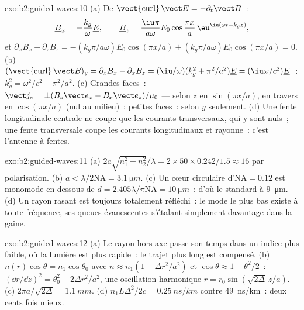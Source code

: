 \begin{solution}{exo:b2:guided-waves:10}
(a) De $\operatorname{\vect{curl}}\vect E = -\partial_t\vect B$~:
\[
\underline B_x = -\frac{k_g}\omega\underline E , \qquad
\underline B_z = \frac{\iu\pi}{a\omega}E_0\cos\frac{\pi x}a\,\eu^{\iu(\omega t - k_gz)} ,
\]
et $\partial_xB_x + \partial_zB_z = -(k_g\pi/a\omega)E_0\cos(\pi x/a) + (k_g\pi/a\omega)E_0
\cos(\pi x/a) = 0$. (b) $(\operatorname{\vect{curl}}\vect B)_y = \partial_zB_x - \partial_xB_z =
(\iu/\omega)(k_g^2 + \pi^2/a^2)\underline E = (\iu\omega/c^2)\underline E$~: $k_g^2 = \omega^2/c^2 - \pi^2/a^2$.
(c) Grandes faces~: $\vect j_s = \pm(B_z\vect e_x - B_x\vect e_z)/\mu_0$ --- selon $z$
en $\sin(\pi x/a)$, en travers en $\cos(\pi x/a)$ (nul au milieu)~; petites
faces~: selon $y$ seulement. (d) Une fente longitudinale centrale ne coupe que les
courants transversaux, qui y sont nuls~; une fente transversale coupe les
courants longitudinaux et rayonne~: c'est l'antenne à fentes.
\end{solution}

\begin{solution}{exo:b2:guided-waves:11}
(a) $2a\sqrt{n_1^2 - n_2^2}/\lambda = 2 \times 50 \times 0.242/1.5 \approx 16$ par polarisation.
(b) $a < \lambda/2\mathrm{NA} = \qty{3.1}{\micro m}$. (c) Un cœur circulaire d'$\mathrm{NA} =
0.12$ est monomode en dessous de $d = 2.405\lambda/\pi\mathrm{NA} = \qty{10}{\micro m}$~: d'où le
standard à \qty{9}{\micro m}. (d) Un rayon rasant est toujours totalement réfléchi~: le
mode le plus bas existe à toute fréquence, ses queues évanescentes s'étalant
simplement davantage dans la gaine.
\end{solution}

\begin{solution}{exo:b2:guided-waves:12}
(a) Le rayon hors axe passe son temps dans un indice plus faible, où la lumière est
plus rapide~: le trajet plus long est compensé. (b) $n(r)\cos\theta = n_1\cos\theta_0$
avec $n \approx n_1(1 - \Delta r^2/a^2)$ et $\cos\theta \approx 1 - \theta^2/2$~: $(\dd r/\dd z)^2 =
\theta_0^2 - 2\Delta r^2/a^2$, une oscillation harmonique $r = r_0\sin(\sqrt{2\Delta}\,z/a)$.
(c) $2\pi a/\sqrt{2\Delta} = \qty{1.1}{mm}$. (d) $n_1L\Delta^2/2c = \qty{0.25}{ns/km}$ contre
\qty{49}{ns/km}~: deux cents fois mieux.
\end{solution}

